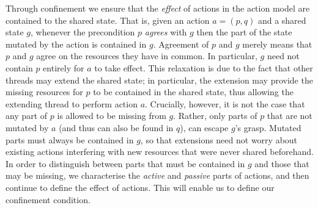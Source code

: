 Through confinement we ensure that the \emph{effect} of actions in the action model are contained to the shared state. That is, given an action $a = (p,q)$ and a shared state $g$, whenever the precondition $p$ \emph{agrees} with $g$ then the part of the state mutated by the action is contained in $g$. 
Agreement of $p$ and $g$ merely means that $p$ and $g$ agree on the resources they have in common. 
In particular, $g$ need not contain $p$ entirely for $a$ to take effect. This relaxation is due to the fact that other threads may extend the shared state; in particular, the extension may provide the missing resources for $p$ to be contained in the shared state, thus allowing the extending thread to perform action $a$. Crucially, however, it is not the case that any part of $p$ is allowed to be missing from $g$. Rather, only parts of $p$ that are not mutated by $a$ (and thus can also be found in $q$), can escape $g$'s grasp. Mutated parts must always be contained in $g$, so that extensions need not worry about existing actions interfering with new resources that were never shared beforehand. In order to distinguish between parts that must be contained in $g$ and those that may be missing, we characterise the \emph{active} and \emph{passive} parts of actions, and then continue to define the effect of actions. This will enable us to define our confinement condition.

